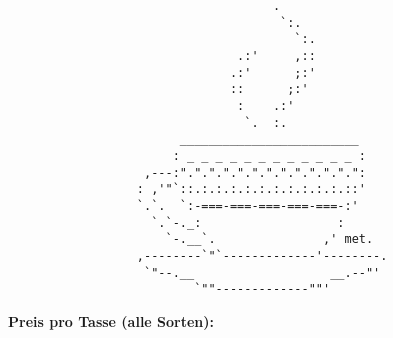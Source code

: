 \documentclass[a4paper, 12pt, ngerman]{article}
\begin{document}
\selectfont

\begin{verbatim}
                                     .
                                      `:.
                                        `:.
                                .:'     ,::
                               .:'      ;:'
                               ::      ;:'
                                :    .:'
                                 `.  :.
                        _________________________
                       : _ _ _ _ _ _ _ _ _ _ _ _ :
                   ,---:".".".".".".".".".".".".":
                  : ,'"`::.:.:.:.:.:.:.:.:.:.:.::'
                  `.`.  `:-===-===-===-===-===-:'
                    `.`-._:                   :
                      `-.__`.               ,' met.
                  ,--------`"`-------------'--------.
                   `"--.__                   __.--"'
                          `""-------------""'
\end{verbatim}

\vspace*{5 mm}

\begin{center}
  \LARGE \textbf{Preis pro Tasse (alle Sorten): }
\end{center}

\large
\end{document}

